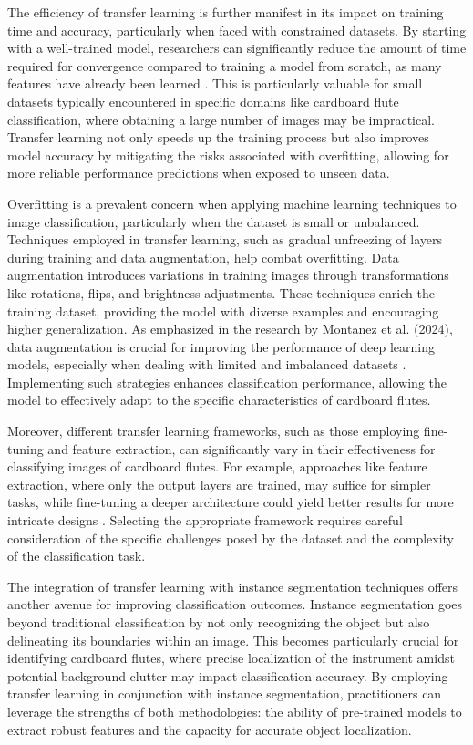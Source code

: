 The efficiency of transfer learning is further manifest in its impact on training time and accuracy, particularly when faced with constrained datasets. By starting with a well-trained model, researchers can significantly reduce the amount of time required for convergence compared to training a model from scratch, as many features have already been learned \cite{tan2019efficientnet}. This is particularly valuable for small datasets typically encountered in specific domains like cardboard flute classification, where obtaining a large number of images may be impractical. Transfer learning not only speeds up the training process but also improves model accuracy by mitigating the risks associated with overfitting, allowing for more reliable performance predictions when exposed to unseen data.


Overfitting is a prevalent concern when applying machine learning techniques to image classification, particularly when the dataset is small or unbalanced. Techniques employed in transfer learning, such as gradual unfreezing of layers during training and data augmentation, help combat overfitting. Data augmentation introduces variations in training images through transformations like rotations, flips, and brightness adjustments. These techniques enrich the training dataset, providing the model with diverse examples and encouraging higher generalization. As emphasized in the research by Montanez et al. (2024), data augmentation is crucial for improving the performance of deep learning models, especially when dealing with limited and imbalanced datasets \cite{montanez2024data}. Implementing such strategies enhances classification performance, allowing the model to effectively adapt to the specific characteristics of cardboard flutes.


Moreover, different transfer learning frameworks, such as those employing fine-tuning and feature extraction, can significantly vary in their effectiveness for classifying images of cardboard flutes. For example, approaches like feature extraction, where only the output layers are trained, may suffice for simpler tasks, while fine-tuning a deeper architecture could yield better results for more intricate designs \cite{mahajan2018exploring}. Selecting the appropriate framework requires careful consideration of the specific challenges posed by the dataset and the complexity of the classification task.


The integration of transfer learning with instance segmentation techniques offers another avenue for improving classification outcomes. Instance segmentation goes beyond traditional classification by not only recognizing the object but also delineating its boundaries within an image. This becomes particularly crucial for identifying cardboard flutes, where precise localization of the instrument amidst potential background clutter may impact classification accuracy. By employing transfer learning in conjunction with instance segmentation, practitioners can leverage the strengths of both methodologies: the ability of pre-trained models to extract robust features and the capacity for accurate object localization.


